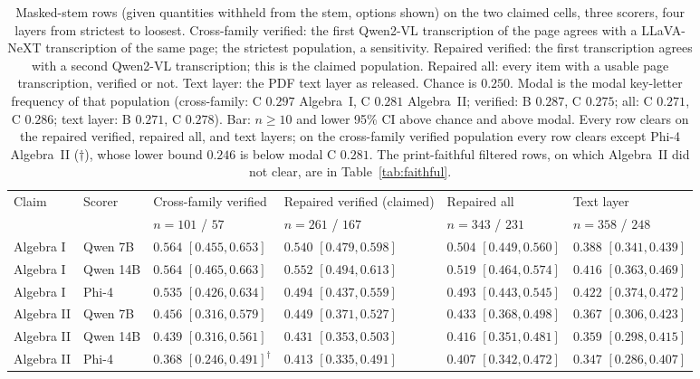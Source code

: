 \begin{table}[t]
  \caption{Masked-stem rows (given quantities withheld from the stem, options shown) on the two claimed cells, three scorers, four layers from strictest to loosest. Cross-family verified: the first Qwen2-VL transcription of the page agrees with a LLaVA-NeXT transcription of the same page; the strictest population, a sensitivity. Repaired verified: the first transcription agrees with a second Qwen2-VL transcription; this is the claimed population. Repaired all: every item with a usable page transcription, verified or not. Text layer: the PDF text layer as released. Chance is $0.250$. Modal is the modal key-letter frequency of that population (cross-family: C $0.297$ Algebra~I, C $0.281$ Algebra~II; verified: B $0.287$, C $0.275$; all: C $0.271$, C $0.286$; text layer: B $0.271$, C $0.278$). Bar: $n\ge 10$ and lower 95\% CI above chance and above modal. Every row clears on the repaired verified, repaired all, and text layers; on the cross-family verified population every row clears except Phi-4 Algebra~II ($\dagger$), whose lower bound $0.246$ is below modal C $0.281$. The print-faithful filtered rows, on which Algebra~II did not clear, are in Table~\ref{tab:faithful}.}
  \label{tab:repaired}
  \centering
  \footnotesize
  \begin{tabular}{l l l l l l}
    \toprule
    Claim & Scorer & Cross-family verified & Repaired verified (claimed) & Repaired all & Text layer \\
    & & $n=101$ / $57$ & $n=261$ / $167$ & $n=343$ / $231$ & $n=358$ / $248$ \\
    \midrule
    Algebra I & Qwen 7B & $0.564$ $[0.455, 0.653]$ & $0.540$ $[0.479, 0.598]$ & $0.504$ $[0.449, 0.560]$ & $0.388$ $[0.341, 0.439]$ \\
    Algebra I & Qwen 14B & $0.564$ $[0.465, 0.663]$ & $0.552$ $[0.494, 0.613]$ & $0.519$ $[0.464, 0.574]$ & $0.416$ $[0.363, 0.469]$ \\
    Algebra I & Phi-4 & $0.535$ $[0.426, 0.634]$ & $0.494$ $[0.437, 0.559]$ & $0.493$ $[0.443, 0.545]$ & $0.422$ $[0.374, 0.472]$ \\
    Algebra II & Qwen 7B & $0.456$ $[0.316, 0.579]$ & $0.449$ $[0.371, 0.527]$ & $0.433$ $[0.368, 0.498]$ & $0.367$ $[0.306, 0.423]$ \\
    Algebra II & Qwen 14B & $0.439$ $[0.316, 0.561]$ & $0.431$ $[0.353, 0.503]$ & $0.416$ $[0.351, 0.481]$ & $0.359$ $[0.298, 0.415]$ \\
    Algebra II & Phi-4 & $0.368$ $[0.246, 0.491]^{\dagger}$ & $0.413$ $[0.335, 0.491]$ & $0.407$ $[0.342, 0.472]$ & $0.347$ $[0.286, 0.407]$ \\
    \bottomrule
  \end{tabular}
\end{table}

